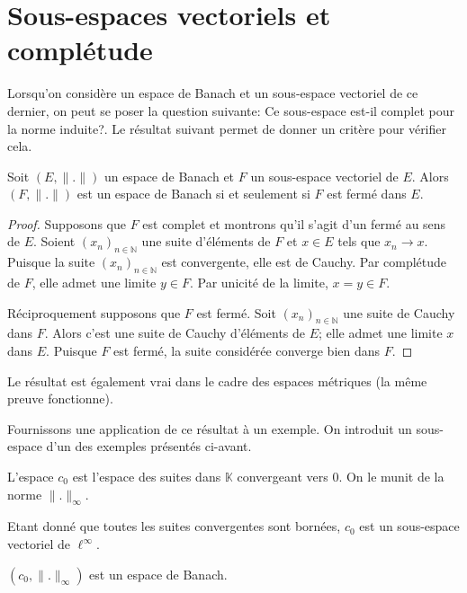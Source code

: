 \section{Sous-espaces vectoriels et complétude}
Lorsqu'on considère un espace de Banach et un sous-espace vectoriel de ce
dernier, on peut se poser la question suivante: \og Ce sous-espace est-il
complet pour la norme induite?\fg.
Le résultat suivant permet de donner un critère pour vérifier cela.

\begin{thm}
  Soit $(E, \|.\|)$ un espace de Banach et $F$ un sous-espace vectoriel de $E$.
  Alors $(F, \|.\|)$ est un espace de Banach si et seulement si $F$ est fermé
  dans $E$.
\end{thm}
\begin{proof}
  Supposons que $F$ est complet et montrons qu'il s'agit d'un fermé au
  sens de $E$. Soient $(x_n)_{n\in\mathbb{N}}$ une suite d'éléments de $F$
  et $x\in E$ tels que $x_n\to x$. Puisque la suite $(x_n)_{n\in\mathbb{N}}$
  est convergente, elle est de Cauchy. Par complétude de $F$, elle admet
  une limite $y\in F$. Par unicité de la limite, $x = y\in F$.

  Réciproquement supposons que $F$ est fermé. Soit $(x_n)_{n\in\mathbb{N}}$
  une suite de Cauchy dans $F$. Alors c'est une suite de Cauchy d'éléments
  de $E$; elle admet une limite $x$ dans $E$. Puisque $F$ est fermé, la
  suite considérée converge bien dans $F$.
\end{proof}

Le résultat est également vrai dans le cadre des espaces métriques (la même
preuve fonctionne).

Fournissons une application de ce résultat à un exemple. On introduit
un sous-espace d'un des exemples présentés ci-avant.

\begin{df}
  L'espace $c_0$ est l'espace des suites dans $\mathbb{K}$
  convergeant vers $0$. On le munit de la norme $\|.\|_\infty$.
\end{df}

Etant donné que toutes les suites convergentes sont bornées,
$c_0$ est un sous-espace vectoriel de $\ell^\infty$.

\begin{prop}
  $(c_0, \|.\|_\infty)$ est un espace de Banach.
\end{prop}

